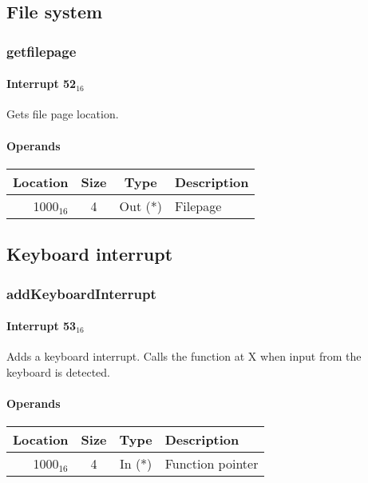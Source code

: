 \documentclass{article}
\begin{document}
\subsection{File system}

\subsubsection{getfilepage}

\paragraph{Interrupt 52$_{16}$}

Gets file page location.

\paragraph{Operands}

\begin{tabular}{|r|c|c|l|}
	\hline
	\textbf{Location} & \textbf{Size} & \textbf{Type} & \textbf{Description} \\
	\hline
	1000$_{16}$ & 4 & Out (*) & Filepage \\
	\hline
\end{tabular}

\subsection{Keyboard interrupt}

\subsubsection{addKeyboardInterrupt}

\paragraph{Interrupt 53$_{16}$}

Adds a keyboard interrupt. Calls the function at X when input from
the keyboard is detected.

\paragraph{Operands}

\begin{tabular}{|r|c|c|l|}
	\hline
	\textbf{Location} & \textbf{Size} & \textbf{Type} & \textbf{Description} \\
	\hline
	1000$_{16}$ & 4 & In (*) & Function pointer \\
	\hline
\end{tabular}
\end{document}
